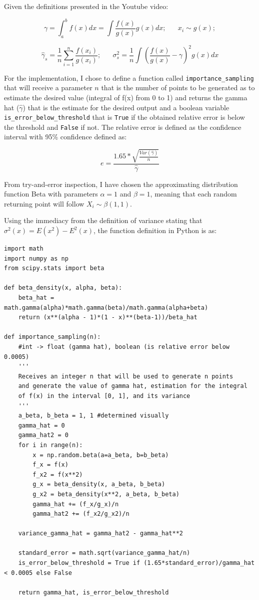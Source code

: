 \documentclass{homework}
\begin{document}
Given the definitions presented in the Youtube video:

\begin{equation}
    \gamma = \int_a^b f(x)dx = \int \frac{f(x)}{g(x)}g(x)dx; \;\;\;\;\;\; x_i \sim g(x);
\end{equation}

\begin{equation}
    \hat \gamma_s = \frac{1}{n}\sum_{i=1}^n \frac{f(x_i)}{g(x_i)}; \;\;\;\;\;\; \sigma_s^2 = \frac{1}{n}\int \left(\frac{f(x)}{g(x)} - \gamma\right)^2 g(x)dx
\end{equation}

For the implementation, I chose to define a function called \verb|importance_sampling| that will receive a parameter $n$ that is the number of points to be generated as to estimate the desired value (integral of f(x) from 0 to 1) and returns the gamma hat ($\hat \gamma$) that is the estimate for the desired output and a boolean variable \verb|is_error_below_threshold| that is \verb|True| if the obtained relative error is below the threshold and \verb|False| if not. The relative error is defined as the confidence interval with 95\% confidence defined as:

\begin{equation}
e = \frac{1.65*\sqrt{\frac{Var(\hat \gamma)}{n}}}{\hat \gamma}
\end{equation}

From try-and-error inspection, I have chosen the approximating distribution function Beta with parameters $\alpha = 1$ and $\beta = 1$, meaning that each random returning point will follow $X_i \sim \beta(1, 1)$.


Using the immediacy from the definition of variance stating that $\sigma^2(x) = E(x^2) - E^2(x)$, the function definition in Python is as:

\begin{lstlisting}
import math
import numpy as np
from scipy.stats import beta

def beta_density(x, alpha, beta):
	beta_hat = math.gamma(alpha)*math.gamma(beta)/math.gamma(alpha+beta)
	return (x**(alpha - 1)*(1 - x)**(beta-1))/beta_hat
	
def importance_sampling(n):
	#int -> float (gamma hat), boolean (is relative error below 0.0005)
	'''
	Receives an integer n that will be used to generate n points
	and generate the value of gamma hat, estimation for the integral
	of f(x) in the interval [0, 1], and its variance
	'''
	a_beta, b_beta = 1, 1 #determined visually
	gamma_hat = 0
	gamma_hat2 = 0
	for i in range(n):
		x = np.random.beta(a=a_beta, b=b_beta)
		f_x = f(x)
		f_x2 = f(x**2)
		g_x = beta_density(x, a_beta, b_beta)
		g_x2 = beta_density(x**2, a_beta, b_beta)
		gamma_hat += (f_x/g_x)/n
		gamma_hat2 += (f_x2/g_x2)/n

	variance_gamma_hat = gamma_hat2 - gamma_hat**2

	standard_error = math.sqrt(variance_gamma_hat/n)
	is_error_below_threshold = True if (1.65*standard_error)/gamma_hat < 0.0005 else False

	return gamma_hat, is_error_below_threshold

\end{lstlisting}
\end{document}
